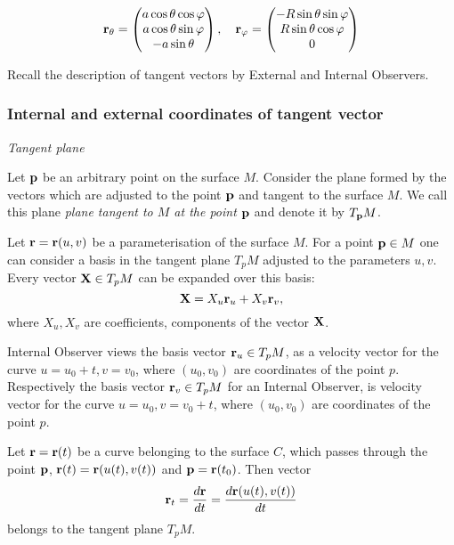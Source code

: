\documentclass[12pt]{article}
\theoremstyle{theorem}
\numberwithin{equation}{section}
\begin{document}
  \begin{equation}
       {\bf r}_\theta =
\begin{pmatrix}
a\cos\theta\cos\varphi\\
   a\cos\theta\sin\varphi\\
  -a\sin\theta\\
\end{pmatrix},
  \quad
  {\bf r}_\varphi=
\begin{pmatrix}
-R\sin\theta\sin\varphi\\
   R\sin\theta\cos\varphi\\
         0\\
  \end{pmatrix}
\end{equation}





Recall the description of tangent vectors by External and Internal Observers.

\subsubsection {Internal and external coordinates of tangent vector}


\centerline {\it Tangent plane}

Let ${\bf p}$ be an arbitrary point on the surface $M$.
Consider the plane formed by the vectors which are adjusted to the point ${\bf p}$
and tangent to the surface $M$. We call this plane
{\it plane tangent to $M$ at the point ${\bf p}$ } and denote it by $T_{\bf p} M$.

Let ${\bf r}={\bf r}(u,v)$ be a parameterisation of the surface $M$. For a point  ${\bf p}\in M$ one can consider a basis
in the tangent plane $T_pM$ adjusted to the parameters $u,v$. Every vector ${\bf X}\in T_pM$
can be expanded over this basis:
\begin{equation}\label{expansion}
  {\bf X}=X_u{\bf r}_u+X_v{\bf r}_v,
\end{equation}
where $X_u, X_v$ are coefficients, components of the vector ${\bf X}$.

Internal Observer views  the basis vector ${\bf r}_u\in T_pM$, as a  velocity vector
for the curve $u=u_0+t,v=v_0$, where $(u_0,v_0)$ are coordinates of the point $p$.
Respectively the basis vector ${\bf r}_v\in T_pM$ for an Internal Observer, is velocity vector
for the curve $u=u_0,v=v_0+t$, where $(u_0,v_0)$ are coordinates of the point $p$.

Let ${\bf r}={\bf r}(t)$ be a curve belonging to the surface $C$, which passes through the point ${\bf p}$,
${\bf r}(t)={\bf r}(u(t),v(t))$ and ${\bf p}={\bf r}(t_0)$. Then vector
\begin{equation}\label{tangenttocurveonthesurface}
  {\bf r}_t={d{\bf r}\over dt}={d{\bf r}(u(t),v(t))\over dt}
\end{equation}
belongs to the tangent plane $T_pM$.
\end{document}
